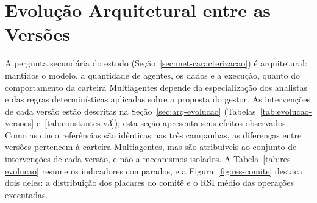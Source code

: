 \section{Evolução Arquitetural entre as Versões}
\label{sec:res-evolucao}

A pergunta secundária do estudo (Seção~\ref{sec:met-caracterizacao}) é arquitetural: mantidos o modelo, a quantidade de agentes, os dados e a execução, quanto do comportamento da carteira Multiagentes depende da especialização dos analistas e das regras determinísticas aplicadas sobre a proposta do gestor. As intervenções de cada versão estão descritas na Seção~\ref{sec:arq-evolucao} (Tabelas~\ref{tab:evolucao-versoes} e~\ref{tab:constantes-v3}); esta seção apresenta seus efeitos observados. Como as cinco referências são idênticas nas três campanhas, as diferenças entre versões pertencem à carteira Multiagentes, mas são atribuíveis ao conjunto de intervenções de cada versão, e não a mecanismos isolados. A Tabela~\ref{tab:res-evolucao} resume os indicadores comparados, e a Figura~\ref{fig:res-comite} destaca dois deles: a distribuição dos placares do comitê e o RSI médio das operações executadas.

